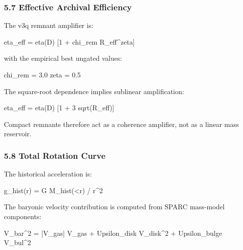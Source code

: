 \documentclass[
]{article}
\newenvironment{Shaded}{}{}
\newcommand{\NormalTok}[1]{#1}
\begin{document}
\subsubsection{5.7 Effective Archival
Efficiency}\label{effective-archival-efficiency}

The v3q remnant amplifier is:

\begin{Shaded}
\begin{Highlighting}[]
\NormalTok{eta\_eff = eta(D) [1 + chi\_rem R\_eff\^{}zeta]}
\end{Highlighting}
\end{Shaded}

with the empirical best ungated values:

\begin{Shaded}
\begin{Highlighting}[]
\NormalTok{chi\_rem = 3.0}
\NormalTok{zeta = 0.5}
\end{Highlighting}
\end{Shaded}

The square-root dependence implies sublinear amplification:

\begin{Shaded}
\begin{Highlighting}[]
\NormalTok{eta\_eff = eta(D) [1 + 3 sqrt(R\_eff)]}
\end{Highlighting}
\end{Shaded}

Compact remnants therefore act as a coherence amplifier, not as a linear
mass reservoir.

\subsubsection{5.8 Total Rotation Curve}\label{total-rotation-curve}

The historical acceleration is:

\begin{Shaded}
\begin{Highlighting}[]
\NormalTok{g\_hist(r) = G M\_hist(\textless{}r) / r\^{}2}
\end{Highlighting}
\end{Shaded}

The baryonic velocity contribution is computed from SPARC mass-model
components:

\begin{Shaded}
\begin{Highlighting}[]
\NormalTok{V\_bar\^{}2 = |V\_gas| V\_gas + Upsilon\_disk V\_disk\^{}2 + Upsilon\_bulge V\_bul\^{}2}
\end{Highlighting}
\end{Shaded}
\end{document}
